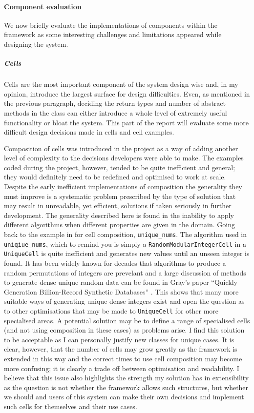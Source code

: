 \paragraph{Component evaluation} We now briefly evaluate the implementations of
components within the framework as some interesting challenges and limitations
appeared while designing the system.

\subparagraph{Cells} Cells are the most important component of the system design
wise and, in my opinion, introduce the largest surface for design difficulties.
Even, as mentioned in the previous paragraph, deciding the return types and
number of abstract methods in the class can either introduce a whole level of
extremely useful functionality or bloat the system. This part of the report will
evaluate some more difficult design decisions made in cells and cell examples.

Composition of cells was introduced in the project as a way of adding another
level of complexity to the decisions developers were able to make. The examples
coded during the project, however, tended to be quite inefficient and general;
they would definitely need to be redefined and optimised to work at scale.
Despite the early inefficient implementations of composition the generality they
must improve is a systematic problem prescribed by the type of solution that may result in unreadable, yet
efficient, solutions if taken seriously in further development. The
generality described here is found in the inability to apply different
algorithms when different properties are given in the domain. Going back to the
example in  for cell composition,
\lstinline{unique_nums}. The algorithm used in \lstinline{uniqiue_nums}, which
to remind you is simply a \lstinline{RandomModularIntegerCell} in a
\lstinline{UniqueCell} is quite inefficient and generates new values until an unseen
integer is found. It has been widely known for decades that algorithms to
produce a random permutations of integers are prevelant and a large discussion
of methods to generate dense
unique random data can be found in Gray's paper ``Quickly Generation
Billion-Record Synthetic Databases'' \cite{GenLargeSynthDB}. This shows that
many more suitable ways of generating unique dense integers exist and open the
question as to other optimisations that may be made to \lstinline{UniqueCell}
for other more specialised areas. A potential solution may be to define a range
of specialised cells (and not using composition in these cases) as problems
arise. I find this solution to be acceptable as I can personally justify new
classes for unique cases. It is clear, however, that the number of cells may
grow greatly as the framework is extended in this way and the correct times to
use cell composition may become more confusing; it is
clearly a trade off between optimisation and readability. I believe that this
issue also highlights the strength my solution has in extensibility as the
question is not whether the framework allows such structures, but whether we
should and users of this system can make their own decisions and implement such
cells for themselves and their use cases.
